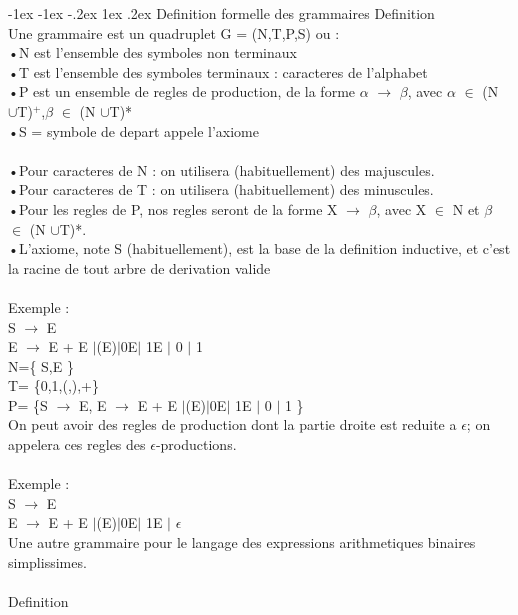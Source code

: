 \documentclass[5pt]{article}
\makeatletter
\renewcommand{\subsubsection}{\@startsection {section}{1}{\z@}%
             {-1ex \@plus -1ex \@minus -.2ex}%
             {1ex \@plus.2ex}%
             {\normalfont\scriptsize\sffamily\bfseries}}
\makeatother
\begin{document}
\begin{scriptsize}
\subsubsection{Definition formelle des grammaires}
Definition\\
Une grammaire est un quadruplet G = (N,T,P,S) ou :\\
•N est l’ensemble des symboles non terminaux \\
•T est l’ensemble des symboles terminaux : caracteres de l’alphabet \\
•P est un ensemble de regles de production, de la forme $\alpha$ $\rightarrow$ $\beta$, avec $\alpha$ $\in$ (N $\cup$T)$^{+}$,$\beta$ $\in$  (N $\cup$T)*\\
•S = symbole de depart appele l’axiome\\
\\
•Pour caracteres de N : on utilisera (habituellement) des majuscules.\\
•Pour caracteres de T : on utilisera (habituellement) des minuscules.\\
•Pour les regles de P, nos regles seront de la forme X $\rightarrow$ $\beta$, avec X $\in$ N et $\beta$ $\in$ (N $\cup$T)*.\\
•L’axiome, note S (habituellement), est la base de la definition inductive, et c’est la racine de tout arbre de derivation valide\\
\\
Exemple :\\
S $\rightarrow$ E\\
E $\rightarrow$ E + E $\mid$(E)$\mid$0E$\mid$ 1E $\mid$ 0 $\mid$ 1\\
N=\{ S,E \}\\
T= \{0,1,(,),+\}\\
P= \{S $\rightarrow$ E, E $\rightarrow$ E + E $\mid$(E)$\mid$0E$\mid$ 1E $\mid$ 0 $\mid$ 1 \}\\
On peut avoir des regles de production dont la partie droite est reduite a $\epsilon$; on appelera ces regles des $\epsilon$-productions.\\
\\
Exemple :\\
S $\rightarrow$ E\\
E $\rightarrow$ E + E $\mid$(E)$\mid$0E$\mid$ 1E $\mid$ $\epsilon$\\
Une autre grammaire pour le langage des expressions arithmetiques binaires simplissimes.\\
\\
Definition\\

\end{scriptsize}
\end{document}
